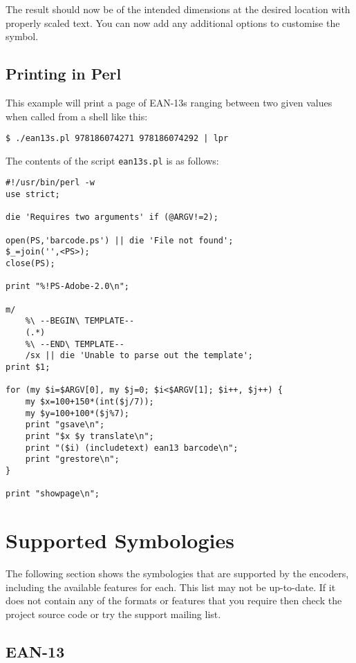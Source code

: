 \documentclass []{article}
\begin{document}
The result should now be of the intended dimensions at the desired location
with properly scaled text. You can now add any additional options to
customise the symbol.

\newpage

\subsection{Printing in Perl}

This example will print a page of EAN-13s ranging between
two given values when called from a shell like this:

\begin{verbatim}
$ ./ean13s.pl 978186074271 978186074292 | lpr
\end{verbatim}

The contents of the script \texttt{ean13s.pl} is as follows:

\begin{verbatim}
#!/usr/bin/perl -w
use strict;

die 'Requires two arguments' if (@ARGV!=2);

open(PS,'barcode.ps') || die 'File not found';
$_=join('',<PS>);
close(PS);

print "%!PS-Adobe-2.0\n";

m/
    %\ --BEGIN\ TEMPLATE--
    (.*)
    %\ --END\ TEMPLATE--
    /sx || die 'Unable to parse out the template';
print $1;

for (my $i=$ARGV[0], my $j=0; $i<$ARGV[1]; $i++, $j++) {
    my $x=100+150*(int($j/7));
    my $y=100+100*($j%7);
    print "gsave\n";
    print "$x $y translate\n";
    print "($i) (includetext) ean13 barcode\n";
    print "grestore\n";
}

print "showpage\n";
\end{verbatim}

\newpage

\section{Supported Symbologies}

The following section shows the symbologies that are supported by
the encoders, including the available features for each. This list
may not be up-to-date. If it does not contain any of the formats or
features that you require then check the project source code or
try the support mailing list.

\subsection{EAN-13}
\end{document}
